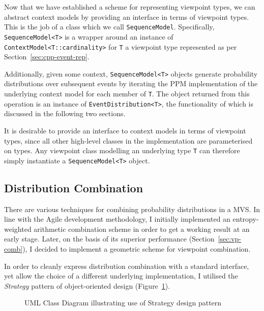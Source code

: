\documentclass[12pt,a4paper,twoside,openright]{report}
\newcommand{\sref}[1]{Section~\ref{#1}}
\begin{document}
Now that we have established a scheme for representing viewpoint types, we can
abstract context models by providing an interface in terms of viewpoint types.
This is the job of a class which we call \texttt{SequenceModel}.  Specifically,
\texttt{SequenceModel<T>} is a wrapper around an instance of
\texttt{ContextModel<T::cardinality>} for \texttt{T} a viewpoint type
represented as per \sref{sec:cpp-event-rep}. 

Additionally, given some context, \texttt{SequenceModel<T>} objects generate
probability distributions over subsequent events by iterating the PPM
implementation of the underlying context model for each member of \texttt{T}.
The object returned from this operation is an instance of
\texttt{EventDistribution<T>}, the functionality of which is discussed in the
following two sections.

It is desirable to provide an interface to context models in terms of viewpoint
types, since all other high-level classes in the implementation are
parameterised on types. Any viewpoint class modelling an underlying type
\texttt{T} can therefore simply instantiate a \texttt{SequenceModel<T>} object.

\subsection{Distribution Combination}

There are various techniques for combining probability distributions in a MVS.
In line with the Agile development methodology, I initially implemented an
entropy-weighted arithmetic combination scheme in order to get a working result
at an early stage. Later, on the basis of its superior performance
(\sref{sec:vp-comb}), I decided to implement a geometric scheme for
viewpoint combination.  

In order to cleanly express distribution combination with a standard interface,
yet allow the choice of a different underlying implementation, I utilised the
\emph{Strategy} pattern of object-oriented design
(Figure~\ref{fig:dist-strategy-uml}).

\begin{figure}[H]
\centering
\caption{UML Class Diagram illustrating use of Strategy design pattern}
\label{fig:dist-strategy-uml}
\end{figure}
\end{document}
